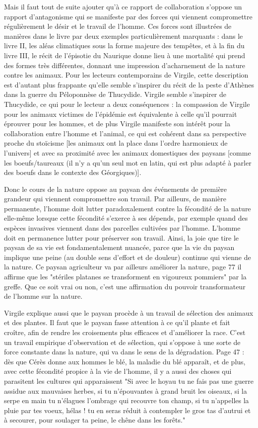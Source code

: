\documentclass[a4paper,12pt]{book}
\begin{document}
\par Mais il faut tout de suite ajouter qu'à ce rapport de collaboration s'oppose un rapport d'antagonisme qui se manifeste par des forces qui viennent compromettre régulièrement le désir et le travail de l'homme. Ces forces sont illustrées de manières dans le livre par deux exemples particulièrement marquants : dans le livre II, les aléas climatiques sous la forme majeure des tempêtes, et à la fin du livre III, le récit de l'épisotie du Naurique donne lieu à une mortalité qui prend des formes très différentes, donnant une impression d'acharnement de la nature contre les animaux. Pour les lecteurs contemporains de Virgile, cette description est d'autant plus frappante qu'elle semble s'inspirer du récit de la peste d'Athènes dans la guerre du Péloponnèse de Thucydide. Virgile semble s'inspirer de Thucydide, ce qui pour le lecteur a deux conséquences : la compassion de Virgile pour les animaux victimes de l'épidémie est équivalente à celle qu'il pourrait éprouver pour les hommes, et de plus Virgile manifeste son intérêt pour la collaboration entre l'homme et l'animal, ce qui est cohérent dans sa perspective proche du stoïcisme [les animaux ont la place dans l'ordre harmonieux de l'univers] et avec sa proximité avec les animaux domestiques des paysans [comme les boeufs/taureaux (il n'y a qu'un seul mot en latin, qui est plus adapté à parler des boeufs dans le contexte des Géorgiques)].
\par Donc le cours de la nature oppose au paysan des événements de première grandeur qui viennent compromettre son travail. Par ailleurs, de manière permanente, l'homme doit lutter paradoxalement contre la fécondité de la nature elle-même lorsque cette fécondité s'exerce à ses dépends, par exemple quand des espèces invasives viennent dans des parcelles cultivées par l'homme. L'homme doit en permanence lutter pour préserver son travail. Ainsi, la joie que tire le paysan de sa vie est fondamentalement nuancée, parce que la vie du paysan implique une peine (au double sens d'effort et de douleur) continue qui vienne de la nature. Ce paysan agriculteur va par ailleurs améliorer la nature, page 77 il affirme que les "stériles platanes se transforment en vigoureux pommiers" par la greffe. Que ce soit vrai ou non, c'est une affirmation du pouvoir transformateur de l'homme sur la nature.
\par Virgile explique aussi que le paysan procède à un travail de sélection des animaux et des plantes. Il faut que le paysan fasse attention à ce qu'il plante et fait croître, afin de rendre les croisements plus efficaces et d'améliorer la race. C'est un travail empirique d'observation et de sélection, qui s'oppose à une sorte de force constante dans la nature, qui va dans le sens de la dégradation. Page 47 : dès que Cérès donne aux hommes le blé, la maladie du blé apparaît, et de plus, avec cette fécondité propice à la vie de l'homme, il y a aussi des choses qui parasitent les cultures qui apparaissent "Si avec le hoyau tu ne fais pas une guerre assidue aux mauvaises herbes, si tu n'épouvantes à grand bruit les oiseaux, si la serpe en main tu n'élagues l'ombrage qui recouvre ton champ, si tu n'appelles la pluie par tes voeux, hélas ! tu en seras réduit à contempler le gros tas d'autrui et à secourer, pour soulager ta peine, le chêne dans les forêts."
\end{document}
